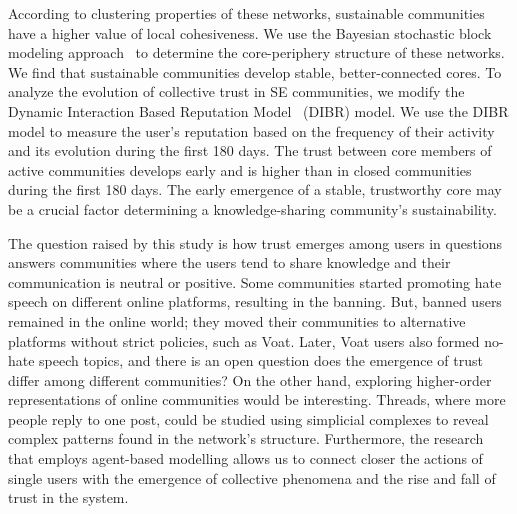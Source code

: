 According to clustering properties of these networks, sustainable communities have a higher value of local cohesiveness. We use the Bayesian stochastic block modeling approach~\cite{gallagher2020clarified} to determine the core-periphery structure of these networks. We find that sustainable communities develop stable, better-connected cores. To analyze the evolution of collective trust in SE communities, we modify the Dynamic Interaction Based Reputation Model~\cite{melnikov2018toward} (DIBR) model. We use the DIBR model to measure the user's reputation based on the frequency of their activity and its evolution during the first 180 days. The trust between core members of active communities develops early and is higher than in closed communities during the first 180 days. The early emergence of a stable, trustworthy core may be a crucial factor determining a knowledge-sharing community's sustainability. 

The question raised by this study is how trust emerges among users in questions answers communities where the users tend to share knowledge and their communication is neutral or positive. Some communities started promoting hate speech on different online platforms, resulting in the banning. But, banned users remained in the online world; they moved their communities to alternative platforms without strict policies, such as Voat. Later, Voat users also formed no-hate speech topics, and there is an open question does the emergence of trust differ among different communities? On the other hand, exploring higher-order representations of online communities would be interesting. Threads, where more people reply to one post, could be studied using simplicial complexes to reveal complex patterns found in the network's structure. Furthermore, the research that employs agent-based modelling allows us to connect closer the actions of single users with the emergence of collective phenomena and the rise and fall of trust in the system. 




	


